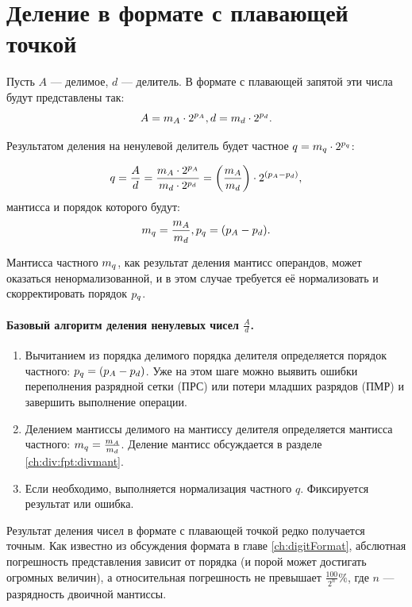 \section{Деление в формате с плавающей точкой}
\label{ch:div:fpt}

Пусть $A$ --- делимое, $d$ --- делитель. В формате с плавающей запятой эти числа будут представлены так:
\[
    A=m_{A}\cdot {2}^{p_{A}}, d=m_{d}\cdot {2}^{p_{d}}.
\]

Результатом деления на ненулевой делитель будет частное $q=m_{q}\cdot {2}^{p_{q}}$:

\[
    q=\frac{A}{d}=
    \frac{m_{A}\cdot {2}^{p_{A}}}{m_{d}\cdot {2}^{p_{d}}}=\left(\frac{m_{A}}{m_{d}}\right)\cdot 2^{(p_{A}-p_{d})},
\]
мантисса и порядок которого будут:
\[
    m_{q} = \frac{m_{A}}{m_{d}}, p_{q}=(p_{A}-p_{d}).
\]

Мантисса частного $m_{q}$, как результат деления мантисс операндов, может оказаться ненормализованной, и в этом случае требуется её нормализовать и скорректировать порядок $p_{q}$.

\paragraph{Базовый алгоритм деления ненулевых чисел $\frac{A}{d}$.}
\begin{enumerate}
    \item Вычитанием из порядка делимого порядка делителя определяется порядок частного: $p_{q}=(p_{A}-p_{d})$. Уже на этом шаге можно выявить ошибки переполнения разрядной сетки (ПРС) или потери младших разрядов (ПМР) и завершить выполнение операции.
    \item Делением мантиссы делимого на мантиссу делителя определяется мантисса частного: $m_{q}=\frac{m_{A}}{m_{d}}$. Деление мантисс обсуждается в разделе \ref{ch:div:fpt:divmant}.
    \item Если необходимо, выполняется нормализация частного $q$. Фиксируется результат или ошибка.
\end{enumerate}

Результат деления чисел в формате с плавающей точкой редко получается точным. Как известно из обсуждения формата в главе \ref{ch:digitFormat}, абслютная погрешность представления зависит от порядка (и порой может достигать огромных величин), а относительная погрешность не превышает $\frac{100}{2^{n}}\%$, где $n$ --- разрядность двоичной мантиссы.


